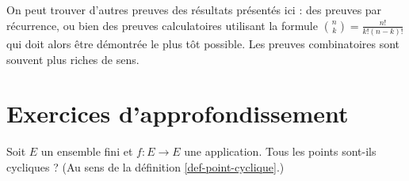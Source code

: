 \begin{remarque}
On peut trouver d'autres preuves des résultats présentés ici : des preuves par récurrence, ou bien des preuves calculatoires utilisant la formule $\binom{n}{k} = \frac{n!}{k!(n-k)!}$ qui doit alors être démontrée le plus tôt possible. Les preuves combinatoires sont souvent plus riches de sens.
\end{remarque}

\section{Exercices d'approfondissement}
\begin{exercice}
Soit $E$ un ensemble fini et $f : E\to E$ une application. Tous les points sont-ils cycliques ? (Au sens de la définition \ref{def-point-cyclique}.)
\end{exercice}